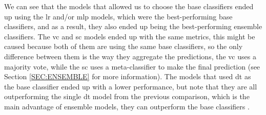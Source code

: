 We can see that the models that allowed us to choose the base classifiers ended up using the \ac{lr} and/or \ac{mlp} models, which were the best-performing base classifiers, and as a result, they also ended up being the best-performing ensemble classifiers. The \ac{vc} and \ac{sc} models ended up with the same metrics, this might be caused because both of them are using the same base classifiers, so the only difference between them is the way they aggregate the predictions, the \ac{vc} uses a majority vote, while the \ac{sc} uses a meta-classifier to make the final prediction (see Section \ref{SEC:ENSEMBLE} for more information).
The models that used \ac{dt} as the base classifier ended up with a lower performance, but note that they are all outperforming the single \ac{dt} model from the previous comparison, which is the main advantage of ensemble models, they can outperform the base classifiers \cite{dietterich_ensemble_2000}.